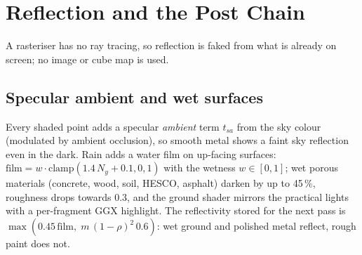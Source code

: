 \section{Reflection and the Post Chain}\label{sec:reflection}
A rasteriser has no ray tracing, so reflection is faked from what is already on screen; no image or cube map is used.

\subsection{Specular ambient and wet surfaces}
Every shaded point adds a specular \emph{ambient} term $t_{sa}$ from the sky colour (modulated by ambient occlusion), so smooth metal shows a faint sky reflection even in the dark. Rain adds a water film on up-facing surfaces:
$\text{film}=w\cdot\mathrm{clamp}(1.4\,N_y+0.1,0,1)$ with the wetness $w\in[0,1]$; wet porous materials (concrete, wood, soil, HESCO, asphalt) darken by up to 45\,\%, roughness drops towards 0.3, and the ground shader mirrors the practical lights with a
per-fragment GGX highlight. The reflectivity stored for the next pass is $\max(0.45\,\text{film},\;m\,(1-\rho)^2\,0.6)$: wet ground and polished metal reflect, rough paint does not.

